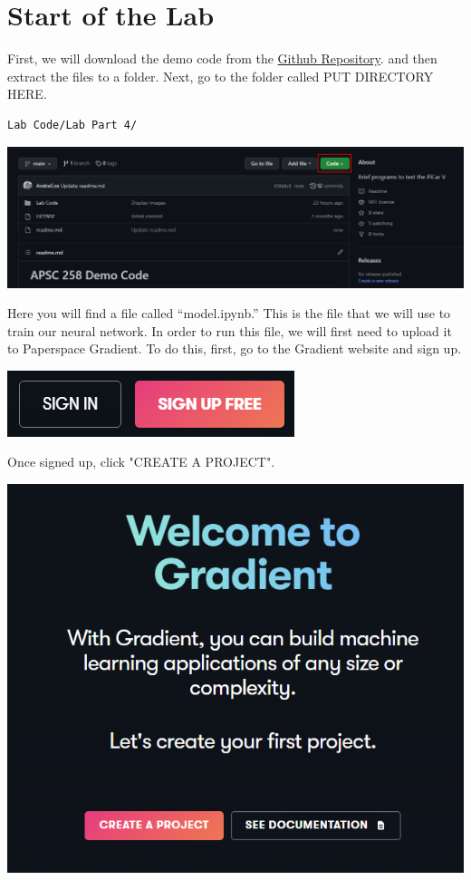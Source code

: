 \documentclass[11pt]{report}
\begin{document}
\chapter{Start of the Lab}
First, we will download the demo code from the \href{https://github.com/PiCarV/Demos/archive/refs/heads/main.zip}{Github Repository}.
and then extract the files to a folder. Next, go to the folder called {PUT DIRECTORY HERE}.

\begin{verbatim} 
Lab Code/Lab Part 4/
\end{verbatim}

\begin{center}
    \includegraphics[scale=0.7]{github.png} 
\end{center}



Here you will find a file called “model.ipynb.” This is the file that we will use to train our neural network. In order to run this file, we will first need to upload it to Paperspace Gradient.
To do this, first, go to the Gradient website and sign up.

\begin{center}
    \includegraphics[scale=0.6]{signinup.png}
\end{center}

Once signed up, click "CREATE A PROJECT".

\begin{center}
    \includegraphics[scale=0.5]{creataproject.png}
\end{center}
\end{document}

